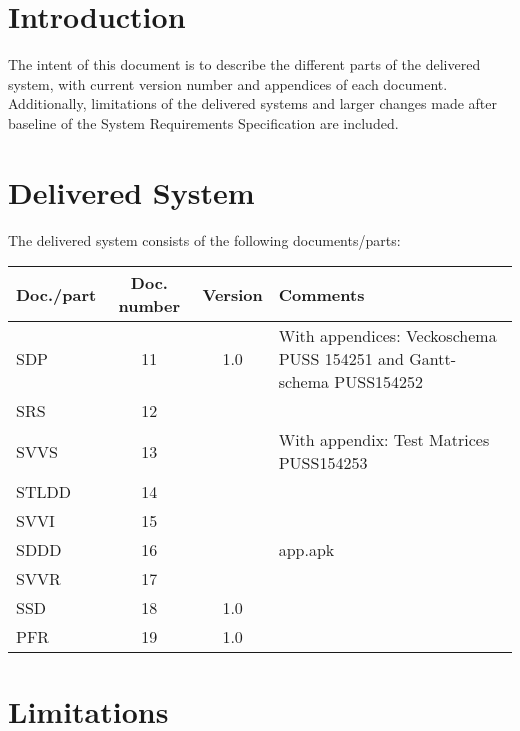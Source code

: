 \documentclass[a4paper]{article}
\begin{document}
\section{Introduction}

The intent of this document is to describe the different parts of the delivered system, with current version number and appendices of each document. Additionally, limitations of the delivered systems and larger changes made after baseline of the System Requirements Specification are included.



\section{Delivered System}

The delivered system consists of the following documents/parts:

\begin{center}
\begin{tabular}{| l | c | c | p{5cm} |}
    \hline
    \textbf{Doc./part} & \textbf{Doc. number} & \textbf{Version} & \textbf{Comments} \\ \hline
    SDP & 11 & 1.0 & With appendices: Veckoschema PUSS 154251 and Gantt-schema PUSS154252 \\ \hline
    SRS & 12 &  & \\ \hline
    SVVS & 13 & & With appendix: Test Matrices PUSS154253 \\ \hline
    STLDD & 14 & & \\ \hline
    SVVI & 15 & & \\ \hline
    SDDD & 16 & & app.apk\\ \hline
    SVVR & 17 & & \\ \hline
    SSD & 18 & 1.0 & \\ \hline
    PFR & 19 & 1.0 & \\ \hline

\end{tabular}
\end{center}

\section{Limitations}
\end{document}
